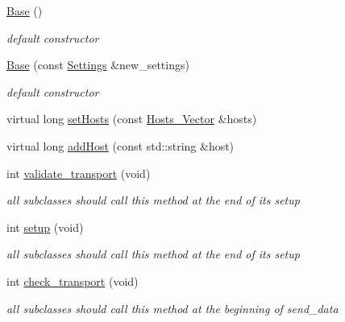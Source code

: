 \begin{DoxyCompactItemize}
\item 
\hyperlink{classMadara_1_1Transport_1_1Base_ab781229077c5f8890796696400abab06}{Base} ()
\begin{DoxyCompactList}\small\item\em default constructor \item\end{DoxyCompactList}\item 
\hyperlink{classMadara_1_1Transport_1_1Base_ac176a3e87a220a5d3086b80f4ae7a610}{Base} (const \hyperlink{classMadara_1_1Transport_1_1Settings}{Settings} \&new\_\-settings)
\begin{DoxyCompactList}\small\item\em default constructor \item\end{DoxyCompactList}\item 
virtual long \hyperlink{classMadara_1_1Transport_1_1Base_aede3e2606396c38455966e155875976d}{setHosts} (const \hyperlink{classMadara_1_1Transport_1_1Base_a2957ae0c413e07b7e276ae69ef1c320a}{Hosts\_\-Vector} \&hosts)
\item 
virtual long \hyperlink{classMadara_1_1Transport_1_1Base_ad2d54b9bb188231988a7e7ac89976d30}{addHost} (const std::string \&host)
\item 
int \hyperlink{classMadara_1_1Transport_1_1Base_a6d31f20d785b8b5a798c20db3975247b}{validate\_\-transport} (void)
\begin{DoxyCompactList}\small\item\em all subclasses should call this method at the end of its setup \item\end{DoxyCompactList}\item 
int \hyperlink{classMadara_1_1Transport_1_1Base_adeef5607708f95b82b7e1968b9396daa}{setup} (void)
\begin{DoxyCompactList}\small\item\em all subclasses should call this method at the end of its setup \item\end{DoxyCompactList}\item 
int \hyperlink{classMadara_1_1Transport_1_1Base_af4ce175b7152c0c3666e128cbbe96e97}{check\_\-transport} (void)
\begin{DoxyCompactList}\small\item\em all subclasses should call this method at the beginning of send\_\-data \item\end{DoxyCompactList}\item 

\end{DoxyCompactItemize}
